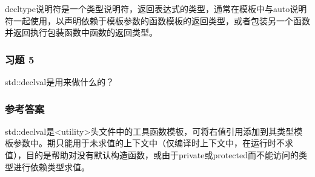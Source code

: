 decltype说明符是一个类型说明符，返回表达式的类型，通常在模板中与auto说明符一起使用，以声明依赖于模板参数的函数模板的返回类型，或者包装另一个函数并返回执行包装函数中函数的返回类型。

\subsubsection{习题 5}

std::declval是用来做什么的？

\subsubsection{参考答案}

std::declval是<utility>头文件中的工具函数模板，可将右值引用添加到其类型模板参数中。期只能用于未求值的上下文中（仅编译时上下文中，在运行时不求值），目的是帮助对没有默认构造函数，或由于private或protected而不能访问的类型进行依赖类型求值。












